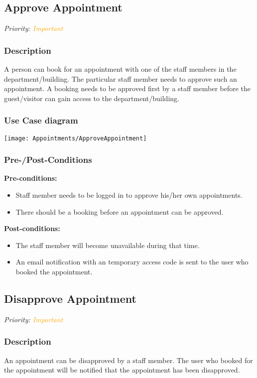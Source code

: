 \subsection{Approve Appointment}
\textit{Priority: \textcolor{orange}{Important}} 

\subsubsection{Description}
A person can book for an appointment with one of the staff members in the department/building. The particular staff member needs to approve such an appointment. A booking needs to be approved first by a staff member before the guest/visitor can gain access to the department/building.

\subsubsection{Use Case diagram}
\texttt{[image: Appointments/ApproveAppointment]}
\subsubsection{Pre-/Post-Conditions}
\textbf{Pre-conditions:} 
	\begin{itemize}
		\item Staff member needs to be logged in to approve his/her own appointments.
		\item There should be a booking before an appointment can be approved.
	\end{itemize}
\textbf{ Post-conditions:} 
	\begin{itemize}
		\item The staff member will become unavailable during that time.
		\item An email notification with an temporary access code is sent to the user who booked the appointment.
	\end{itemize}

\subsection{Disapprove Appointment}
\textit{Priority: \textcolor{orange}{Important}}

\subsubsection{Description}
An appointment can be disapproved by a staff member. The user who booked for the appointment will be notified that the appointment has been disapproved. 

